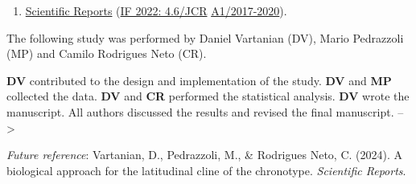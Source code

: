 \documentclass[
  12pt,
  a4paper,
  oneside]{tesesusp}
\providecommand{\tightlist}{%
  \setlength{\itemsep}{0pt}\setlength{\parskip}{0pt}}\usepackage{longtable,booktabs,array}
\begin{document}
\begin{tcolorbox}[enhanced jigsaw, rightrule=.15mm, colback=white, colbacktitle=quarto-callout-note-color!10!white, toptitle=1mm, bottomtitle=1mm, toprule=.15mm, bottomrule=.15mm, colframe=quarto-callout-note-color-frame, opacitybacktitle=0.6, opacityback=0, coltitle=black, left=2mm, breakable, titlerule=0mm, title=\textcolor{quarto-callout-note-color}{\faInfo}\hspace{0.5em}{Target}, arc=.35mm, leftrule=.75mm]

\begin{enumerate}
\def\labelenumi{\arabic{enumi}.}
\tightlist
\item
  \href{https://www.nature.com/srep/author-instructions}{Scientific
  Reports} (\href{https://jcr.clarivate.com/jcr/}{IF 2022: 4.6/JCR}
  \textbar{}
  \href{https://sucupira.capes.gov.br/sucupira/public/consultas/coleta/veiculoPublicacaoQualis/listaConsultaGeralPeriodicos.jsf}{A1/2017-2020}).
\end{enumerate}

\end{tcolorbox}

\begin{tcolorbox}[enhanced jigsaw, rightrule=.15mm, colback=white, colbacktitle=quarto-callout-note-color!10!white, toptitle=1mm, bottomtitle=1mm, toprule=.15mm, bottomrule=.15mm, colframe=quarto-callout-note-color-frame, opacitybacktitle=0.6, opacityback=0, coltitle=black, left=2mm, breakable, titlerule=0mm, title=\textcolor{quarto-callout-note-color}{\faInfo}\hspace{0.5em}{Note}, arc=.35mm, leftrule=.75mm]

The following study was performed by Daniel Vartanian (DV), Mario
Pedrazzoli (MP) and Camilo Rodrigues Neto (CR).

\vspace{5pt}

\textbf{DV} contributed to the design and implementation of the study.
\textbf{DV} and \textbf{MP} collected the data. \textbf{DV} and
\textbf{CR} performed the statistical analysis. \textbf{DV} wrote the
manuscript. All authors discussed the results and revised the final
manuscript. --\textgreater{}

\vspace{5pt}

\emph{Future reference}: Vartanian, D., Pedrazzoli, M., \& Rodrigues
Neto, C. (2024). A biological approach for the latitudinal cline of the
chronotype. \emph{Scientific Reports}.

\end{tcolorbox}
\end{document}
